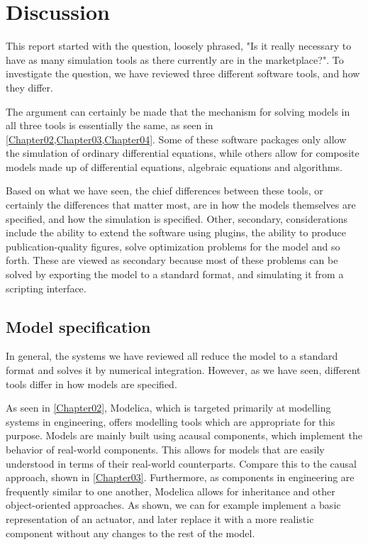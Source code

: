 \documentclass[\rootfolder/main.tex]{subfiles}
\begin{document}
\chapter{Discussion} %

\label{Chapter06} %

This report started with the question, loosely phrased, "Is it really necessary to have as many simulation tools as there currently are in the marketplace?".
To investigate the question, we have reviewed three different software tools, and how they differ.

The argument can certainly be made that the mechanism for solving models in all three tools is essentially the same, as seen in \cref{Chapter02,Chapter03,Chapter04}.
Some of these software packages only allow the simulation of ordinary differential equations, while others allow for composite models made up of differential equations, algebraic equations and algorithms.

Based on what we have seen, the chief differences between these tools, or certainly the differences that matter most, are in how the models themselves are specified, and how the simulation is specified.
Other, secondary, considerations include the ability to extend the software using plugins, the ability to produce publication-quality figures, solve optimization problems for the model and so forth.
These are viewed as secondary because most of these problems can be solved by exporting the model to a standard format, and simulating it from a scripting interface.

\section{Model specification}

In general, the systems we have reviewed all reduce the model to a standard format and solves it by numerical integration.
However, as we have seen, different tools differ in how models are specified.

As seen in \cref{Chapter02}, Modelica, which is targeted primarily at modelling systems in engineering, offers modelling tools which are appropriate for this purpose.
Models are mainly built using acausal components, which implement the behavior of real-world components.
This allows for models that are easily understood in terms of their real-world counterparts.
Compare this to the causal approach, shown in \cref{Chapter03}.
Furthermore, as components in engineering are frequently similar to one another, Modelica allows for inheritance and other object-oriented approaches.
As shown, we can for example implement a basic representation of an actuator, and later replace it with a more realistic component without any changes to the rest of the model.
\end{document}
